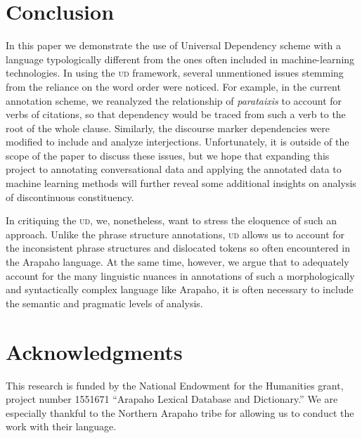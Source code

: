 \documentclass[11pt]{article}
\begin{document}
\section{Conclusion} \label{concl}
In this paper we demonstrate the use of Universal Dependency scheme with a language typologically different from the ones often included in machine-learning technologies. In using the \textsc{ud} framework, several unmentioned issues stemming from the reliance on the word order were noticed. For example, in the current annotation scheme, we reanalyzed the relationship of \textit{parataixis} to account for verbs of citations, so that dependency would be traced from such a verb to the root of the whole clause. Similarly, the discourse marker dependencies were modified to include and analyze interjections. Unfortunately, it is outside of the scope of the paper to discuss these issues, but we hope that expanding this project to annotating conversational data and applying the annotated data to machine learning methods will further reveal some additional insights on analysis of discontinuous constituency. 

In critiquing the \textsc{ud}, we, nonetheless, want to stress the eloquence of such an approach. Unlike the phrase structure annotations, \textsc{ud} allows us to account for the inconsistent phrase structures and dislocated tokens so often encountered in the Arapaho language. At the same time, however, we argue that to adequately account for the many linguistic nuances in annotations of such a morphologically and syntactically complex language like Arapaho, it is often necessary to include the semantic and pragmatic levels of analysis. 
\section*{Acknowledgments}
This research is funded by the National Endowment for the Humanities grant, project number 1551671 ``Arapaho Lexical Database and Dictionary.'' We are especially thankful to the Northern Arapaho tribe for allowing us to conduct the work with their language.



\vfill \eject
\end{document}
